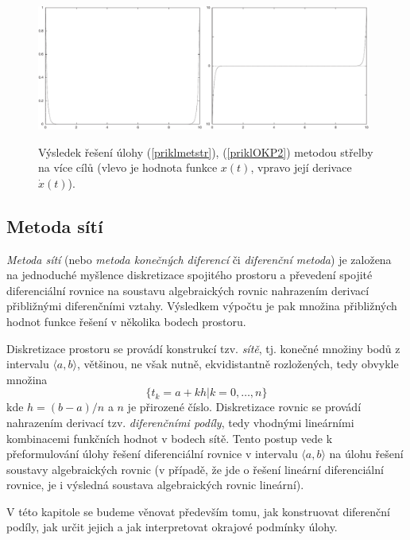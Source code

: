 \documentclass[a4paper, 12pt]{book}
\theoremstyle{definition}
\begin{document}
\begin{figure}[ht]
\centering
\includegraphics[width=0.98\textwidth]{matice}\\
\caption[]{Výsledek řešení úlohy (\ref{priklmetstr}), (\ref{priklOKP2}) metodou střelby na více cílů
(vlevo je hodnota funkce $x(t)$, vpravo její derivace $\dot x(t)$).}
\label{matice}
\end{figure}

\subsection{Metoda sítí}

{\em Metoda sítí} (nebo {\em metoda konečných diferencí} či {\em diferenční metoda})
je založena na jednoduché myšlence diskretizace spojitého prostoru a převedení 
spojité diferenciální rovnice na soustavu algebraických rovnic nahrazením derivací 
přibližnými diferenčními vztahy. Výsledkem výpočtu je pak množina přibližných hodnot funkce
řešení v několika bodech prostoru.

Diskretizace prostoru se provádí konstrukcí tzv. {\em sítě}, tj. konečné množiny bodů
z intervalu $\langle a,b\rangle$, většinou, ne však nutně, ekvidistantně rozložených, tedy
obvykle množina 
\begin{equation}\label{sitFDM}
\{t_k=a+kh | k=0,\dots,n\}
\end{equation}
kde $h =(b-a)/n$ a $n$ je přirozené číslo.
Diskretizace rovnic se provádí nahrazením derivací tzv. {\em diferenčními podíly}, tedy 
vhodnými lineárními kombinacemi funkčních hodnot v bodech sítě. Tento postup vede 
k přeformulování úlohy řešení diferenciální rovnice v intervalu $\langle a,b\rangle$ na
úlohu řešení soustavy algebraických rovnic (v případě, že jde o řešení lineární 
diferenciální rovnice, je i výsledná soustava algebraických rovnic lineární).

V této kapitole se budeme věnovat především tomu, jak konstruovat diferenční podíly, 
jak určit jejich  a jak interpretovat okrajové podmínky úlohy.
\end{document}
